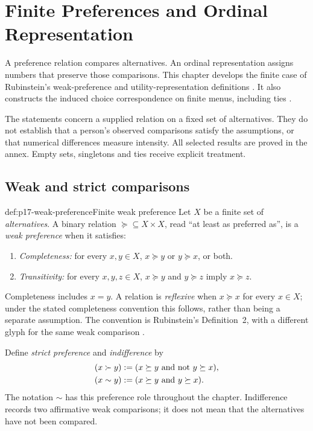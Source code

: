 \chapter{Finite Preferences and Ordinal Representation}
\label{sec:p17-finite-preferences}

A preference relation compares alternatives. An ordinal representation
assigns numbers that preserve those comparisons. This chapter develops the
finite case of Rubinstein's weak-preference and utility-representation
definitions \cite[2015 revision, pp.~5--8 and 12--14]{Rubinstein2015LectureNotes}.
It also constructs the induced choice correspondence on finite menus,
including ties \cite[p.~31]{Rubinstein2015LectureNotes}.

The statements concern a supplied relation on a fixed set of alternatives.
They do not establish that a person's observed comparisons satisfy the
assumptions, or that numerical differences measure intensity. All selected
results are proved in the annex. Empty sets, singletons and ties receive
explicit treatment.

\section{Weak and strict comparisons}
\label{sec:p17-preference-relations}

\begin{hbdefinition}{def:p17-weak-preference}{Finite weak preference}
Let \(X\) be a finite set of \emph{alternatives}. A binary relation
\(\succeq\subseteq X\times X\), read ``at least as preferred as'',
is a \emph{weak preference} when it satisfies:
\begin{enumerate}
\item \emph{Completeness:} for every \(x,y\in X\),
      \(x\succeq y\) or \(y\succeq x\), or both.
\item \emph{Transitivity:} for every \(x,y,z\in X\),
      \(x\succeq y\) and \(y\succeq z\) imply \(x\succeq z\).
\end{enumerate}
Completeness includes \(x=y\). A relation is \emph{reflexive} when
\(x\succeq x\) for every \(x\in X\); under the stated completeness
convention this follows, rather than being a separate assumption. The
convention is Rubinstein's Definition~2, with a different glyph for the
same weak comparison \cite[pp.~5--6]{Rubinstein2015LectureNotes}.

Define \emph{strict preference} and \emph{indifference} by
\[
\begin{aligned}
 (x\succ y)&\mathrel{:=}
       (x\succeq y\text{ and not }y\succeq x),\\
 (x\sim y)&\mathrel{:=}
       (x\succeq y\text{ and }y\succeq x).
\end{aligned}
\]
The notation \(\sim\) has this preference role throughout the chapter.
Indifference records two affirmative weak comparisons; it does not mean
that the alternatives have not been compared.
\end{hbdefinition}

